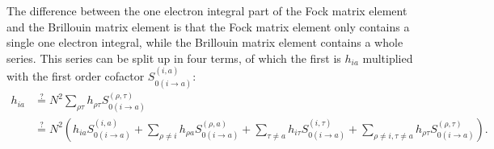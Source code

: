 The difference between the one electron integral part of the Fock matrix element and the Brillouin matrix element is that the Fock matrix element only contains a single one electron integral, while the Brillouin matrix element contains a whole series. This series can be split up in four terms, of which the first is $h_{ia}$ multiplied with the first order cofactor $S_{0(i\rightarrow a)}^{(i,a)}$: 
\begin{equation}
\begin{split}
h_{ia} &\stackrel {?}{=} N^2 \sum_{\rho\tau} h_{\rho\tau} S_{0(i\rightarrow a)}^{(\rho,\tau)}\\
&\stackrel {?}{=} N^2 (h_{ia} S_{0(i\rightarrow a)}^{(i,a)} + \sum_{\rho \ne i} h_{\rho a} S_{0(i\rightarrow a)}^{(\rho,a)} +  \sum_{\tau \ne a} h_{i\tau} S_{0(i\rightarrow a)}^{(i,\tau)} + \sum_{\rho \ne i, \tau \ne a} h_{\rho\tau} S_{0(i\rightarrow a)}^{(\rho,\tau)}).
\end{split}
\label{ch2.eq.oneelpart2}
\end{equation}

